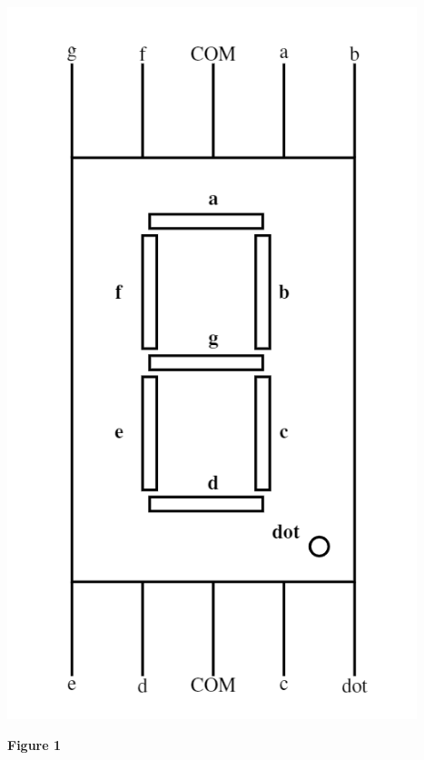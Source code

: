 \documentclass[journal,12pt,twocolumn]{IEEEtran}
\begin{document}
\includegraphics{ss fig.png}
\begin{center}
\textbf{Figure 1}
\end{center}
\end{document}
